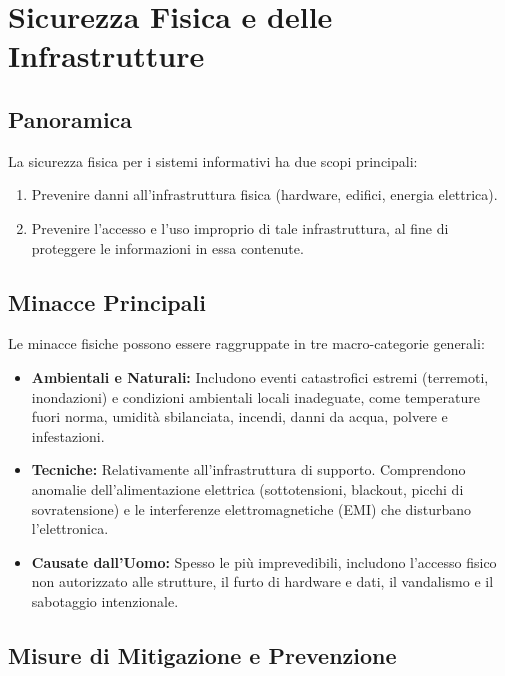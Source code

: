 \chapter{Sicurezza Fisica e delle Infrastrutture}

\section{Panoramica}
La sicurezza fisica per i sistemi informativi ha due scopi principali:
\begin{enumerate}
    \item Prevenire danni all'infrastruttura fisica (hardware, edifici, energia elettrica).
    \item Prevenire l'accesso e l'uso improprio di tale infrastruttura, al fine di proteggere le informazioni in essa contenute.
\end{enumerate}

\section{Minacce Principali}

Le minacce fisiche possono essere raggruppate in tre macro-categorie generali:

\begin{itemize}
    \item \textbf{Ambientali e Naturali:} Includono eventi catastrofici estremi (terremoti, inondazioni) e condizioni ambientali locali inadeguate, come temperature fuori norma, umidità sbilanciata, incendi, danni da acqua, polvere e infestazioni.
    \item \textbf{Tecniche:} Relativamente all'infrastruttura di supporto. Comprendono anomalie dell'alimentazione elettrica (sottotensioni, blackout, picchi di sovratensione) e le interferenze elettromagnetiche (EMI) che disturbano l'elettronica.
    \item \textbf{Causate dall'Uomo:} Spesso le più imprevedibili, includono l'accesso fisico non autorizzato alle strutture, il furto di hardware e dati, il vandalismo e il sabotaggio intenzionale.
\end{itemize}

\section{Misure di Mitigazione e Prevenzione}

